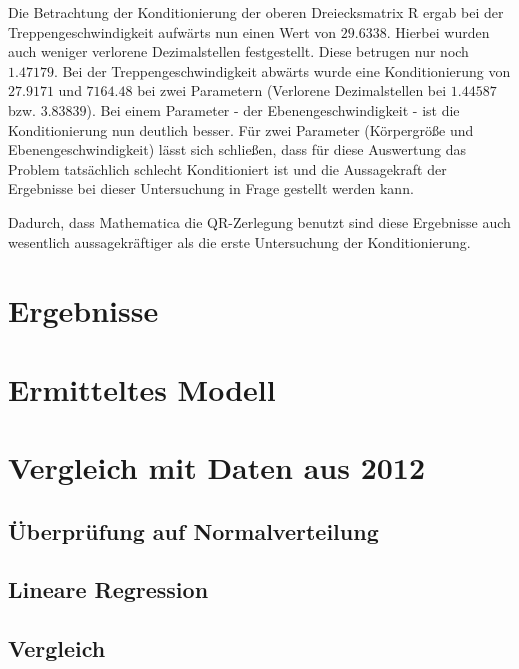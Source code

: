Die Betrachtung der Konditionierung der oberen Dreiecksmatrix R ergab bei der Treppengeschwindigkeit aufwärts nun einen Wert von $29.6338$. Hierbei wurden auch weniger verlorene Dezimalstellen festgestellt. Diese betrugen nur noch $1.47179$. Bei der Treppengeschwindigkeit abwärts wurde eine Konditionierung von $27.9171$ und $7164.48$ bei zwei Parametern (Verlorene Dezimalstellen bei $1.44587$ bzw. $3.83839$). Bei einem Parameter - der Ebenengeschwindigkeit - ist die Konditionierung nun deutlich besser. Für zwei Parameter (Körpergröße und Ebenengeschwindigkeit) lässt sich schließen, dass für diese Auswertung das Problem tatsächlich schlecht Konditioniert ist und die Aussagekraft der Ergebnisse bei dieser Untersuchung in Frage gestellt werden kann.

Dadurch, dass Mathematica die QR-Zerlegung benutzt sind diese Ergebnisse auch wesentlich aussagekräftiger als die erste Untersuchung der Konditionierung.



\section{Ergebnisse}
\section{Ermitteltes Modell}

\section{Vergleich mit Daten aus 2012}
\subsection{Überprüfung auf Normalverteilung}
\subsection{Lineare Regression}
\subsection{Vergleich}

